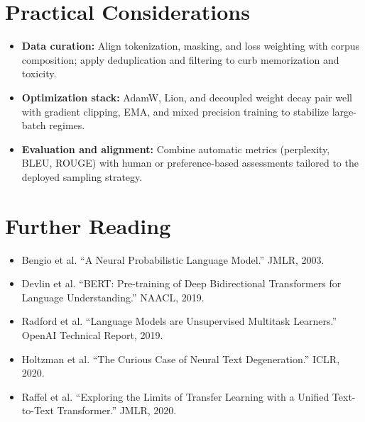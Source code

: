\documentclass{article}
\begin{document}
\section{Practical Considerations}
\begin{itemize}
  \item \textbf{Data curation:} Align tokenization, masking, and loss weighting with corpus composition; apply deduplication and filtering to curb memorization and toxicity.
  \item \textbf{Optimization stack:} AdamW, Lion, and decoupled weight decay pair well with gradient clipping, EMA, and mixed precision training to stabilize large-batch regimes.
  \item \textbf{Evaluation and alignment:} Combine automatic metrics (perplexity, BLEU, ROUGE) with human or preference-based assessments tailored to the deployed sampling strategy.
\end{itemize}

\section*{Further Reading}
\begin{itemize}
  \item Bengio et al. ``A Neural Probabilistic Language Model.'' JMLR, 2003.
  \item Devlin et al. ``BERT: Pre-training of Deep Bidirectional Transformers for Language Understanding.'' NAACL, 2019.
  \item Radford et al. ``Language Models are Unsupervised Multitask Learners.'' OpenAI Technical Report, 2019.
  \item Holtzman et al. ``The Curious Case of Neural Text Degeneration.'' ICLR, 2020.
  \item Raffel et al. ``Exploring the Limits of Transfer Learning with a Unified Text-to-Text Transformer.'' JMLR, 2020.
\end{itemize}
\end{document}
